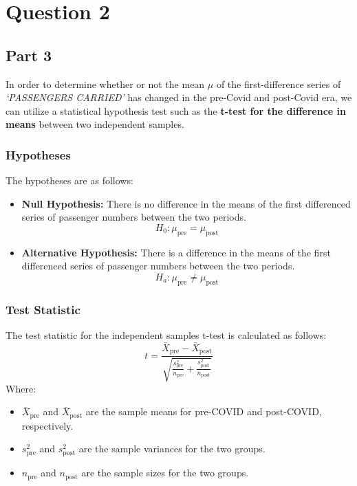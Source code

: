 \documentclass[
]{article}
\author{}
\date{}
\begin{document}
\section{Question 2}

\subsection{Part 3}

In order to determine whether or not the mean $\mu$ of the first-difference
series of \textit{`PASSENGERS CARRIED'} has changed in the pre-Covid and post-Covid era, we can utilize a statistical hypothesis test such as the \textbf{t-test for the difference in means} between two independent samples. 

\subsubsection{Hypotheses}

The hypotheses are as follows:

\begin{itemize}
\item
  \textbf{Null Hypothesis:} There is no difference in the means of the
  first differenced series of passenger numbers between the two periods.
    \[
    H_0: \mu_{\text{pre}} = \mu_{\text{post}}
    \]
\item
  \textbf{Alternative Hypothesis:} There is a difference in the means of
  the first differenced series of passenger numbers between the two
  periods.
    \[
    H_a: \mu_{\text{pre}} \neq \mu_{\text{post}}
    \]
\end{itemize}

\subsubsection{Test Statistic}

The test statistic for the independent samples t-test is calculated as follows:
\[
t = \frac{\bar{X}_{\text{pre}} - \bar{X}_{\text{post}}}{\sqrt{\frac{s_{\text{pre}}^2}{n_{\text{pre}}} + \frac{s_{\text{post}}^2}{n_{\text{post}}}}}
\]
Where:
\begin{itemize}
    \item \( \bar{X}_{\text{pre}} \) and \( \bar{X}_{\text{post}} \) are the sample means for pre-COVID and post-COVID, respectively.
    \item \( s_{\text{pre}}^2 \) and \( s_{\text{post}}^2 \) are the sample variances for the two groups.
    \item \( n_{\text{pre}} \) and \( n_{\text{post}} \) are the sample sizes for the two groups.
\end{itemize}
\end{document}

